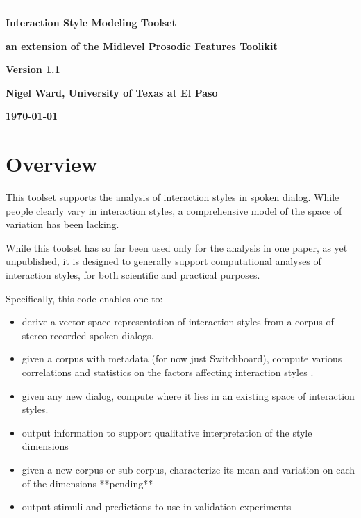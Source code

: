 \documentclass[11pt]{article}
\begin{document}
\noindent
\thispagestyle{empty}
\sloppy

\rule{1mm}{0mm}

\vspace{-17mm}
{\LARGE \bf Interaction Style Modeling  Toolset }

\smallskip
{\large \bf an extension of the  Midlevel Prosodic Features Toolikit}
\medskip


{\LARGE \bf Version 1.1}
\vspace{7mm}


{\bf Nigel Ward, University of Texas at El Paso}

{\bf \today }
\bigskip


\vspace{-3.5ex}
\section{Overview}    \label{sec:overview}

This toolset supports the analysis of interaction styles in spoken
dialog.  While people clearly vary in interaction styles, a
comprehensive model of the space of variation has been lacking.

While this toolset has so far been used only for the analysis in one
paper, as yet unpublished, it is designed to generally support
computational analyses of interaction styles, for both scientific and
practical purposes.

Specifically, this code enables one to:

\begin{itemize}   \setlength{\itemsep}{0pt}\setlength{\parskip}{0pt}
\item derive a vector-space representation of interaction styles from
  a corpus of stereo-recorded spoken dialogs.
\item given a corpus with metadata (for now just  Switchboard), compute various
  correlations and statistics on the factors affecting interaction styles .
\item given any new dialog, compute where it lies in an existing space
  of interaction styles.
\item output information to support qualitative interpretation of the
  style dimensions
\item given a new corpus or sub-corpus, characterize its mean and
  variation on each of the dimensions **pending**
\item output stimuli and predictions to use in validation experiments
\end{itemize}
\end{document}

